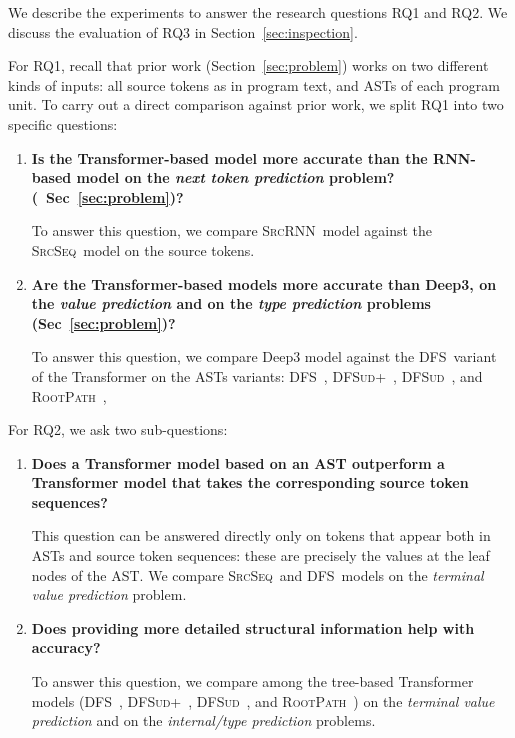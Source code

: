 \documentclass[nonacm, sigconf]{acmart}
\newcommand{\abbr}[1]{\textsc{#1}~}
\newcommand{\SrcSeq}{\abbr{SrcSeq}} \newcommand{\SrcRNN}{\abbr{SrcRNN}} \newcommand{\LeafSeq}{\abbr{LeafSeq}} \newcommand{\RootPath}{\abbr{RootPath}} \newcommand{\LeafTokens}{\abbr{LeafTokens}} \newcommand{\DFS}{\abbr{DFS}} \newcommand{\TreeRel}{\abbr{DFS{ud}}} \newcommand{\TreeReli}{\abbr{DFS{ud+}}}
\newcommand{\secref}[1]{Sec~\ref{#1}}
\begin{document}
We describe the experiments to answer the research questions RQ1 and RQ2. We discuss the evaluation of RQ3 in Section~\ref{sec:inspection}.

For RQ1, recall that prior work (Section~\ref{sec:problem}) works on two different kinds of inputs: all source tokens as in program text, and ASTs of each program unit.
To carry out a direct comparison against prior work, we split RQ1 into two specific questions:

\begin{enumerate}[label=RQ1.\arabic*]
\item \textbf{Is the Transformer-based model more accurate than the RNN-based model on the \textit{next token prediction} problem? (~\secref{sec:problem})?}  

To answer this question, we compare \SrcRNN model against the \SrcSeq model on the source tokens.

\item \textbf{Are the Transformer-based models more accurate than Deep3, on the \textit{value prediction} and on the \textit{type prediction} problems (Sec~\ref{sec:problem})?}

To answer this question, we compare Deep3 model against the \DFS variant of the Transformer on the ASTs variants: \DFS, \TreeReli, \TreeRel, and \RootPath, 

\end{enumerate}

For RQ2, we ask two sub-questions:

\begin{enumerate}[label=RQ2.\arabic*]
    
    \item \textbf{Does a Transformer model based on an AST outperform a Transformer model that takes the corresponding source token sequences?}

    This question can be answered directly only on tokens that appear both in ASTs and source token sequences: these are precisely the values at the leaf nodes of the AST.  We compare \SrcSeq and \DFS models on the \textit{terminal value prediction} problem.

    \item \textbf{Does providing more detailed structural information help with accuracy?}

    To answer this question, we compare among the tree-based Transformer models (\DFS, \TreeReli, \TreeRel, and \RootPath) on the \textit{terminal value prediction} and on the \textit{internal/type prediction} problems.

\end{enumerate}
\end{document}
